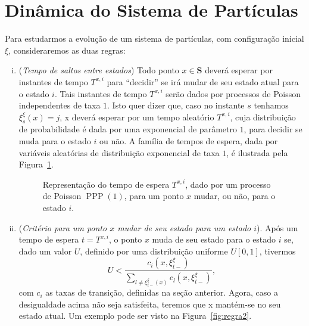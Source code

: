 \documentclass[twoside,openright,titlepage,numbers=noenddot,headinclude,  lineheaders footinclude=true,cleardoublepage=empty,
                                BCOR=5mm,paper=a4,fontsize=12pt ]{scrbook}
\theoremstyle{definition}
\DeclareMathOperator{\PPP}{PPP}
\begin{document}
\section{Din\^{a}mica do Sistema de Part\'{i}culas}
Para estudarmos a evolução de um sistema de partículas,
com configuração inicial $\xi$,
consideraremos as duas regras:
\begin{enumerate}[(i)]

\item (\textit{Tempo de saltos entre estados})
Todo ponto $x \in \mathbf{S}$ deverá esperar
por instantes de tempo $T^{x,i}$ para ``decidir'' 
se irá mudar de seu
estado atual para o estado $i$.
Tais instantes de tempo $T^{x,i}$ serão dados por 
 processos de Poisson independentes
de taxa $1$. Isto quer dizer que, caso
no instante $s$ tenhamos $\xi^{\xi}_s(x) = j$, x deverá %
esperar por um tempo aleatório $T^{x,i}$, cuja distribuição
de probabilidade é dada por uma exponencial de parâmetro
$1$, para decidir se muda para o estado $i$ ou não.
A família de tempos de espera, dada por variáveis 
aleatórias de distribuição exponencial de taxa
$1$, é ilustrada  pela Figura~\ref{fig:espera}.


\begin{figure}[h] 
\centering
{}
\caption{Representação do tempo de espera $T^{x,i}$, dado
por um processo de Poisson $\PPP(1)$, para um ponto $x$ mudar,
ou não, para o estado $i$.}
\label{fig:espera}
\end{figure}

\item (\textit{Critério para um ponto $x$ mudar de seu estado
para um estado $i$}). Após um tempo de espera $t = T^{x,i}$, 
o ponto $x$ muda de seu estado para o estado $i$ se, 
dado um valor $U$, definido por uma distribuição uniforme
$U[0,1]$, tivermos 
\[U < \frac{c_i(x, \xi^{\xi}_{t-})}{\sum_{l \neq \xi^{\xi}_{t-}(x)} c_l(x, \xi^{\xi}_{t-})},\]
com $c_i$ as taxas de transição, definidas na seção anterior.
Agora, caso a desigualdade acima não seja satisfeita, teremos
que x mantém-se no seu estado atual. Um exemplo pode ser visto
na Figura~\ref{fig:regra2}.
\end{enumerate}
\end{document}
